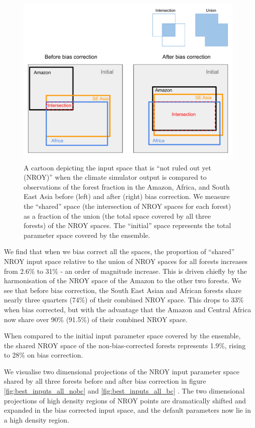\documentclass[gmd, manuscript]{copernicus}
\begin{document}
\begin{figure}[t]
\includegraphics[width=12cm]{../graphics/NROY_cartoon.pdf}
\caption{A cartoon depicting the input space that is ``not ruled out yet (NROY)'' when the climate simulator output is compared to observations of the forest fraction in the Amazon, Africa, and South East Asia before (left) and after (right) bias correction. We measure the ``shared'' space (the intersection of NROY spaces for each forest) as a fraction of the union (the total space covered by all three forests) of the NROY spaces. The ``initial'' space represents the total parameter space covered by the ensemble.
}
\label{fig:NROY_cartoon}
\end{figure}


We find that when we bias correct all the spaces, the proportion of ``shared'' NROY input space relative to the union of NROY spaces for all forests increases from 2.6\% to 31\% - an order of magnitude increase. This is driven chiefly by the harmonisation of the NROY space of the Amazon to the other two forests. We see that before bias correction, the South East Asian and African forests share nearly three quarters (74\%) of their combined NROY space. This drops to 33\% when bias corrected, but with the advantage that the Amazon and Central Africa now share over 90\% (91.5\%) of their combined NROY space. 

When compared to the initial input parameter space covered by the ensemble, the shared NROY space of the non-bias-corrected forests represents 1.9\%, rising to 28\% on bias correction.

We visualise two dimensional projections of the NROY input parameter space shared by all three forests before and after bias correction in figure \ref{fig:best_inputs_all_nobc} and \ref{fig:best_inputs_all_bc} . The two dimensional projections of high density regions of NROY points are dramatically shifted and expanded in the bias corrected input space, and the default parameters now lie in a high density region.
\end{document}

